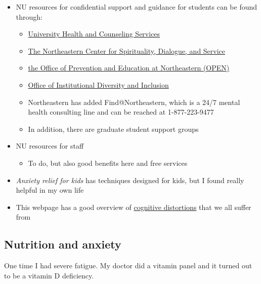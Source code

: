 \documentclass[
  letterpaper,
  DIV=11,
  numbers=noendperiod]{scrreprt}
\providecommand{\tightlist}{%
  \setlength{\itemsep}{0pt}\setlength{\parskip}{0pt}}\usepackage{longtable,booktabs,array}
\begin{document}
\begin{itemize}
\item
  NU resources for confidential support and guidance for students can be
  found through:

  \begin{itemize}
  \item
    \href{https://www.northeastern.edu/uhcs/}{University Health and
    Counseling Services}
  \item
    \href{https://www.northeastern.edu/spirituallife/}{The Northeastern
    Center for Spirituality, Dialogue, and Service}
  \item
    \href{https://studentlife.northeastern.edu/open/}{the Office of
    Prevention and Education at Northeastern (OPEN)}
  \item
    \href{https://provost.northeastern.edu/oidi/}{Office of
    Institutional Diversity and Inclusion}
  \item
    Northeastern has added Find@Northeastern, which is a 24/7 mental
    health consulting line and can be reached at 1-877-223-9477
  \item
    In addition, there are graduate student support groups
  \end{itemize}
\item
  NU resources for staff

  \begin{itemize}
  \tightlist
  \item
    To do, but also good benefits here and free services
  \end{itemize}
\item
  \emph{Anxiety relief for kids} has techniques designed for kids, but I
  found really helpful in my own life
\item
  This webpage has a good overview of
  \href{https://positivepsychology.com/cognitive-distortions/}{cognitive
  distortions} that we all suffer from
\end{itemize}

\hypertarget{nutrition-and-anxiety}{%
\subsection*{\texorpdfstring{\textbf{Nutrition and
anxiety}}{Nutrition and anxiety}}\label{nutrition-and-anxiety}}

One time I had severe fatigue. My doctor did a vitamin panel and it
turned out to be a vitamin D deficiency.
\end{document}
